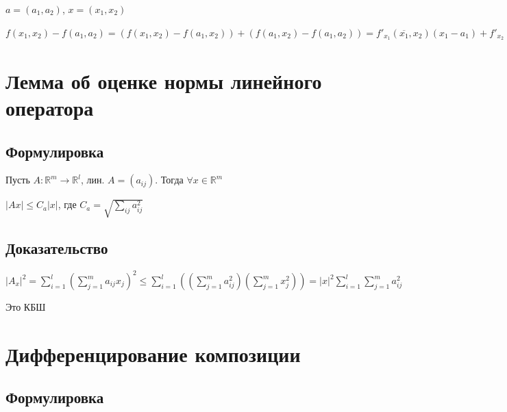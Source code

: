 \documentclass{article}
\begin{document}
            $a = (a_1, a_2)$, $x = (x_1, x_2)$
            
            $f(x_1, x_2) - f(a_1, a_2) = \left( f(x_1, x_2) - f(a_1, x_2) \right) + \left(f(a_1, x_2) - f(a_1, a_2) \right) = f'_{x_1} (\overline{x_1}, x_2)(x_1 - a_1) + f'_{x_2}(x_1, \overline{x_2})(x_2 - a_2) = f'_{x_1}(a_1, a_2)(x_1 - a_1) + f'_{x_2} (a_1, a_2)(x_2 - a_2) + (f'_{x_1}(\overline{x_1}, x_2) - f'_{x_1}(a_1, a_2))(x_1 - a_1) + (f'_{x_2}(a, \overline{x_2}) - f'_{x_2}(a_1, a_2)(x_2 - a_2)$
            
    \newpage
    
    \section{Лемма об оценке нормы линейного оператора}
    
        \subsection{Формулировка}
        
            Пусть $A : \mathbb{R}^m \rightarrow \mathbb{R}^l$, лин. $A = (a_{ij})$. Тогда $\forall x \in \mathbb{R}^m$
            
            $\left| Ax \right| \leq C_a |x|$, где $C_a = \sqrt{\sum\limits_{ij} a^2_{ij}}$
            
        \subsection{Доказательство}
        
            $\left| A_x \right|^2 = \sum\limits^l_{i = 1} \left( \sum\limits^m_{j = 1} a_{ij} x_j \right)^2 \leq \sum\limits^l_{i = 1} \left( \left( \sum\limits^m_{j = 1} a_{ij}^2 \right) \left( \sum\limits^m_{j = 1} x_j^2 \right) \right) = |x|^2 \sum\limits^l_{i = 1} \sum\limits^m_{j = 1} a_{ij}^2$
            
            Это КБШ
            
    \newpage
    
    \section{Дифференцирование композиции}
    
        \subsection{Формулировка}
        
\end{document}
